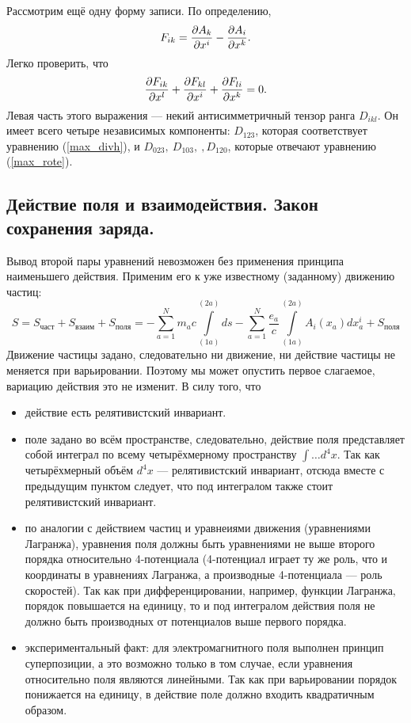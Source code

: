     \begin{note} Рассмотрим ещё одну форму записи. По определению,
        \[
            F_{ik} = \frac{\partial A_k}{\partial x^i} - \frac{\partial A_i}{\partial x^k}.
        \]
        Легко проверить, что
        \[
            \frac{\partial F_{ik}}{\partial x^l} + \frac{\partial F_{kl}}{\partial x^i} + \frac{\partial F_{li}}{\partial x^k} = 0.
        \]
        Левая часть этого выражения --- некий антисимметричный тензор  ранга $D_{ikl}$.
        Он имеет всего четыре независимых компоненты: $D_{123}$, которая соответствует уравнению (\ref{max_divh}),
        и $D_{023}, \: D_{103}, \:, D_{120}$, которые отвечают уравнению (\ref{max_rote}).
    \end{note}

\subsection{Действие поля и взаимодействия. Закон сохранения заряда.}
    Вывод второй пары уравнений невозможен без применения принципа наименьшего действия. Применим его к уже известному (заданному)
    движению частиц:
    \[
        S = S_{\textrm{част}} + S_{\textrm{взаим}} + S_{\textrm{поля}} =
        -\sum_{a=1}^N m_a c \int\limits_{(1a)}^{(2a)}ds -\sum_{a=1}^N  \frac{e_a}{c} \int\limits_{(1a)}^{(2a)}A_i(x_a)dx_a^i + S_{\textrm{поля}}
    \]
    Движение частицы задано, следовательно ни движение, ни действие частицы не меняется при варьировании. Поэтому мы может опустить первое слагаемое,
    вариацию действия это не изменит.
    В силу того, что
    \begin{itemize}
        \item действие есть релятивистский инвариант.
        \item поле задано во всём пространстве, следовательно, действие поля представляет собой интеграл по всему четырёхмерному пространству $\int \ldots d^4x$.
            Так как четырёхмерный объём $d^4x$ --- релятивистский инвариант, отсюда вместе с предыдущим пунктом следует, что под интегралом
            также стоит релятивистский инвариант.
        \item по аналогии с действием частиц и уравнеиями движения (уравнениями Лагранжа), уравнения поля должны быть уравнениями не выше второго
            порядка относительно 4-потенциала (4-потенциал играет ту же роль, что и координаты в уравнениях Лагранжа, а производные 4-потенциала --- роль скоростей). 
            Так как при дифференцировании, например, функции Лагранжа, порядок повышается на единицу, то и под интегралом действия поля
            не должно быть производных от потенциалов выше первого порядка.
        \item экспериментальный факт: для электромагнитного поля выполнен принцип суперпозиции, а это возможно только в том случае, если уравнения
            относительно поля являются линейными. Так как при варьировании порядок понижается на единицу, в действие поле должно входить
            квадратичным образом.
    \end{itemize}
